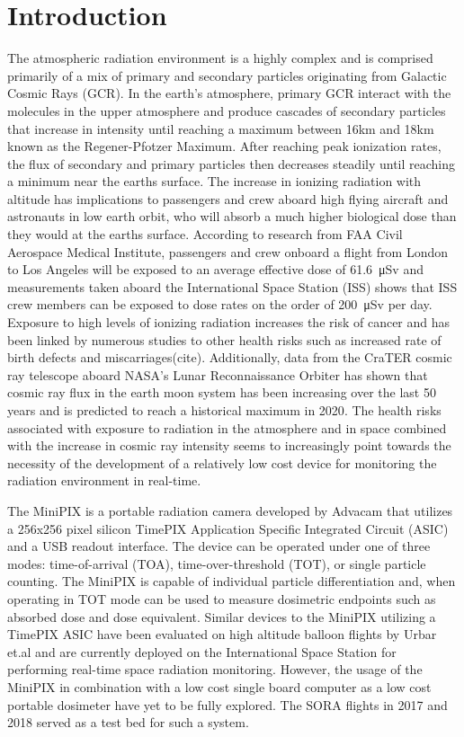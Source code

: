 \section{Introduction}
\label{Introduction}
The atmospheric radiation environment is a highly complex and is comprised primarily of a mix of primary and secondary particles originating from Galactic Cosmic Rays (GCR). In the earth’s atmosphere, primary GCR interact with the molecules in the upper atmosphere and produce cascades of secondary particles that increase in intensity until reaching a maximum between 16km and 18km known as the Regener-Pfotzer Maximum. After reaching peak ionization rates, the flux of secondary and primary particles then decreases steadily until reaching a minimum near the earths surface. The increase in ionizing radiation with altitude has implications to passengers and crew aboard high flying aircraft and astronauts in low earth orbit, who will absorb a much higher biological dose than they would at the earths surface. According to research from FAA Civil Aerospace Medical Institute, passengers and crew onboard a flight from London to Los Angeles will be exposed to an average effective dose of \SI{61.6}{\micro\sievert}\cite{faa} and measurements taken aboard the International Space Station (ISS) shows that ISS crew members can be exposed to dose rates on the order of \SI{200}{\micro\sievert} per day. Exposure to high levels of ionizing radiation increases the risk of cancer and has been linked by numerous studies to other health risks such as increased rate of birth defects and miscarriages(cite). Additionally, data from the CraTER cosmic ray telescope aboard NASA’s Lunar Reconnaissance Orbiter has shown that cosmic ray flux in the earth moon system has been increasing over the last 50 years and is predicted to reach a historical maximum in 2020\cite{crater}. The health risks associated with exposure to radiation in the atmosphere and in space combined with the increase in cosmic ray intensity seems to increasingly point towards the necessity of the development of a relatively low cost device for monitoring the radiation environment in real-time.

The MiniPIX is a portable radiation camera developed by Advacam that utilizes a 256x256 pixel silicon TimePIX Application Specific Integrated Circuit (ASIC) and a USB readout interface. The device can be operated under one of three modes: time-of-arrival (TOA), time-over-threshold (TOT), or single particle counting. The MiniPIX is capable of individual particle differentiation and, when operating in TOT mode can be used to measure dosimetric endpoints such as absorbed dose and dose equivalent. Similar devices to the MiniPIX utilizing a TimePIX ASIC have been evaluated on high altitude balloon flights by Urbar et.al\cite{bexus} and are currently deployed on the International Space Station for performing real-time space radiation monitoring\cite{timepixiss}. However, the usage of the MiniPIX in combination with a low cost single board computer as a low cost portable dosimeter have yet to be fully explored. The SORA flights in 2017 and 2018 served as a test bed for such a system.

